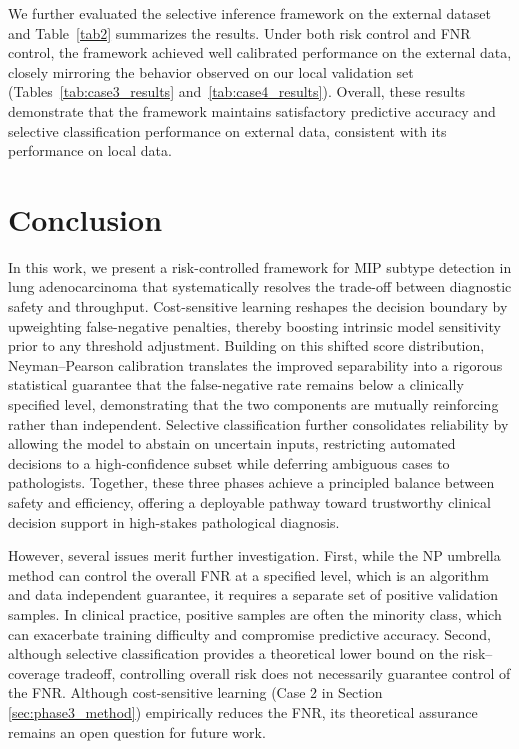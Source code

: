 \documentclass[journal,twoside,web]{ieeecolor}
\begin{document}
We further evaluated the selective inference framework on the external dataset and Table~\ref{tab2} summarizes the results. Under both risk control and FNR control, the framework achieved well calibrated performance on the external data, closely mirroring the behavior observed on our local validation set (Tables~\ref{tab:case3_results} and~\ref{tab:case4_results}). Overall, these results demonstrate that the framework maintains satisfactory predictive accuracy and selective classification performance on external data, consistent with its performance on local data.

\section{Conclusion}

In this work, we present a risk-controlled framework for MIP subtype detection in lung adenocarcinoma that systematically resolves the trade-off between diagnostic safety and throughput. Cost-sensitive learning reshapes the decision boundary by upweighting false-negative penalties, thereby boosting intrinsic model sensitivity prior to any threshold adjustment. Building on this shifted score distribution, Neyman--Pearson calibration translates the improved separability into a rigorous statistical guarantee that the false-negative rate remains below a clinically specified level, demonstrating that the two components are mutually reinforcing rather than independent. Selective classification further consolidates reliability by allowing the model to abstain on uncertain inputs, restricting automated decisions to a high-confidence subset while deferring ambiguous cases to pathologists. Together, these three phases achieve a principled balance between safety and efficiency, offering a deployable pathway toward trustworthy clinical decision support in high-stakes pathological diagnosis.

However, several issues merit further investigation. First, while the NP umbrella method can control the overall FNR at a specified level, which is an algorithm and data independent guarantee, it requires a separate set of positive validation samples. In clinical practice, positive samples are often the minority class, which can exacerbate training difficulty and compromise predictive accuracy. Second, although selective classification provides a theoretical lower bound on the risk–coverage tradeoff, controlling overall risk does not necessarily guarantee control of the FNR. Although cost-sensitive learning (Case 2 in Section \ref{sec:phase3_method}) empirically reduces the FNR, its theoretical assurance remains an open question for future work.
\end{document}
